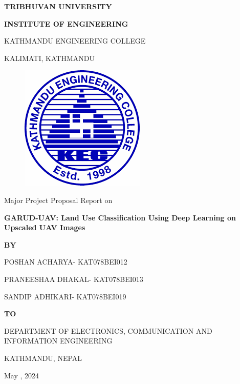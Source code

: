 \begin{titlepage}
    \thispagestyle{empty}
    \begin{center}
    
    \vspace*{\fill} %
    \vspace*{-1cm}
    {\Large \textbf{TRIBHUVAN UNIVERSITY
}\par}
{\large \textbf{INSTITUTE OF ENGINEERING
}\par}
\vspace{12pt}
KATHMANDU ENGINEERING COLLEGE

KALIMATI, KATHMANDU
\vspace{24pt}

\begin{figure}[ht]
    \centering
    \includegraphics[scale=0.45]{images/kec.png}
\end{figure}
\vspace{24pt}
{Major Project Proposal Report on\par}
\vspace{6pt}
{\textbf{GARUD-UAV: Land Use Classification Using Deep Learning on Upscaled UAV Images}\par}

\vspace{18pt}
{\textbf{BY}\par}
\vspace{10pt}
    
{POSHAN ACHARYA- KAT078BEI012\par}
{PRANEESHAA DHAKAL- KAT078BEI013\par}
{SANDIP ADHIKARI- KAT078BEI019\par}

\vspace{28pt}
{\textbf{TO}\par}
\vspace{10pt}
{DEPARTMENT OF ELECTRONICS, COMMUNICATION AND INFORMATION ENGINEERING\par}
{KATHMANDU, NEPAL\par}
\vspace{14pt}
{May , 2024\par}

    \vspace*{\fill}

    \end{center}
\end{titlepage}